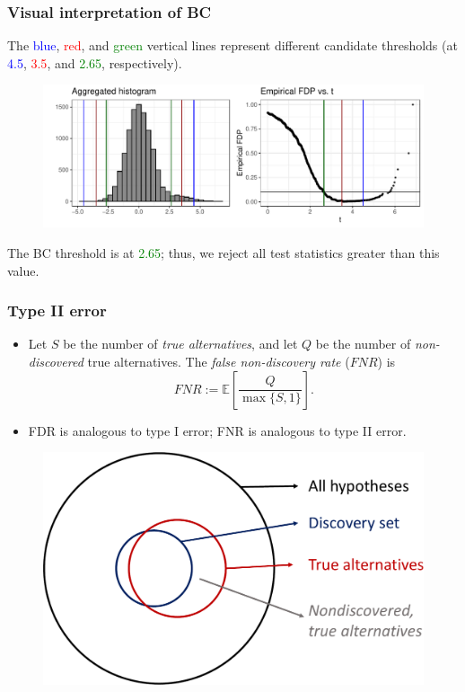 \documentclass{beamer}
\begin{document}
\begin{frame}
\frametitle{Visual interpretation of BC}
The \textcolor{blue}{blue}, \textcolor{red}{red}, and \textcolor{green}{green} vertical lines represent different candidate thresholds (at \textcolor{blue}{4.5}, \textcolor{red}{3.5}, and \textcolor{green}{2.65}, respectively).
\begin{figure}
	\centering
	\includegraphics[width=1.0\linewidth]{agg_test_stats}
\end{figure}
The BC threshold is at \textcolor{green}{2.65}; thus, we reject all test statistics greater than this value.
\end{frame}

\begin{frame}
\frametitle{Type II error}

\begin{itemize}
\item Let $S$ be the number of \textit{true alternatives}, and let $Q$ be the number of \textit{non-discovered} true alternatives. The \textit{false non-discovery rate} ($FNR$) is 
$$FNR := \mathbb{E} \left[ \frac{Q}{ \max\{ S, 1 \} } \right].$$
\item FDR is analogous to type I error; FNR is analogous to type II error.

\end{itemize}
\begin{figure}
	\centering
	\includegraphics[width=0.6\linewidth]{fnr_crop}
	\label{fig:fnrcrop}
\end{figure}
\end{frame}
\end{document}

